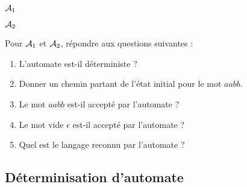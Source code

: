 \documentclass[a4paper,french,bookmarks]{book}
\begin{document}
\begin{center}
        \begin{minipage}{0.48\linewidth}
            \begin{center}
                $\mathcal{A}_1$
            \end{center}
        \end{minipage}
        \hfill
        \begin{minipage}{0.48\linewidth}
            \begin{center}
                $\mathcal{A}_2$
            \end{center}
        \end{minipage}
    \end{center}
    
    Pour $\mathcal{A}_1$ et $\mathcal{A}_2$, répondre aux questions suivantes :
    \begin{enumerate}
        \item L'automate est-il déterministe ?

        
        \item Donner un chemin partant de l'état initial pour le mot $aabb$.
        
        
        \item Le mot $aabb$ est-il accepté par l'automate ?
        
        \item Le mot vide $\epsilon$ est-il accepté par l'automate ?
        
        \item Quel est le langage reconnu par l'automate ?
    \end{enumerate}
    
    \subsection{Déterminisation d'automate}
    
\end{document}
